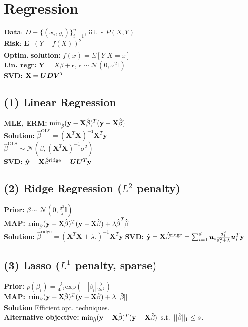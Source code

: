 \section*{Regression}
\textbf{Data}:
$D=\{(x_i,y_i)\}_{i=1}^n$, iid. $\sim P(X,Y)$\\
\textbf{Risk}:
$\mathbf{E}[(Y - f(X))^2]$\\
\textbf{Optim. solution:} $f(x) = E[Y|X=x]$\\
\textbf{Lin. regr:}
$\mathbf{Y}=X\beta + \epsilon$, $\epsilon \sim \mathcal{N}(0,\sigma^2\mathbb{I})$\\
\textbf{SVD:} $\mathbf{X} = {\bm{U}}{\bm{D}}{\bm{V}}^T$


\subsection*{(1) Linear Regression}
\textbf{MLE, ERM:} $\min_{\hat{\kern0pt \beta}}(\mathbf{y}-\mathbf{X}\hat{\kern0pt \beta})^T(\mathbf{y}-\mathbf{X}\hat{\kern0pt \beta})$\\
\textbf{Solution:} $\hat{\beta}^\text{OLS} = (\mathbf{X}^T\mathbf{X})^{-1}\mathbf{X}^{T}\mathbf{y}$\\
$\hat{\beta}^\textrm{OLS} \sim \mathcal{N}(\beta, (\mathbf{X}^T\mathbf{X})^{-1}\sigma^2)$\\
\textbf{SVD:} $\hat{\mathbf{y}} = \mathbf{X}\hat{\beta}^\text{ridge} = {\bm{U}}{\bm{U}}^T\mathbf{y}$

\subsection*{(2) Ridge Regression ($L^2$ penalty)}
\textbf{Prior:} $\beta \sim \mathcal{N}(0, \frac{\sigma^2}{\lambda}\mathbb{I})$\\
\textbf{MAP:} $\min_{\hat{\kern0pt \beta}}(\mathbf{y}-\mathbf{X}\hat{\kern0pt \beta})^T(\mathbf{y}-\mathbf{X}\hat{\kern0pt \beta})+\lambda\hat{\kern0pt \beta}^T\hat{\kern0pt \beta}$\\
\textbf{Solution:} $\hat{\beta}^\text{ridge} = (\mathbf{X}^T\mathbf{X}+\lambda\mathbb{I})^{-1}\mathbf{X}^{T}\mathbf{y}$
\textbf{SVD:} $\hat{\mathbf{y}} = \mathbf{X}\hat{\beta}^\text{ridge} = \sum_{i=1}^d{{\bm{u}}_i\frac{d_i^2}{d_i^2+\lambda}{\bm{u}}_i^T\mathbf{y}}$

\subsection*{(3) Lasso ($L^1$ penalty, sparse)}
\textbf{Prior:} $p(\beta_i) = \frac{\lambda}{4\sigma^2}\mathrm{exp}(-|\beta_i|\frac{\lambda}{2\sigma^2})$\\
\textbf{MAP:} $\min_{\hat{\kern0pt \beta}}(\mathbf{y}-\mathbf{X}\hat{\kern0pt \beta})^T(\mathbf{y}-\mathbf{X}\hat{\kern0pt \beta})+\lambda||\hat{\kern0pt \beta}||_1$\\
\textbf{Solution} Efficient opt. techniques.\\
\textbf{Alternative objective:} $\min_{\hat{\kern0pt \beta}}(\mathbf{y}-\mathbf{X}\hat{\kern0pt \beta})^T(\mathbf{y}-\mathbf{X}\hat{\kern0pt \beta})\,\,\, \mathrm{s.t.}\,\,\, ||\hat{\kern0pt \beta}||_1 \leq s$.


